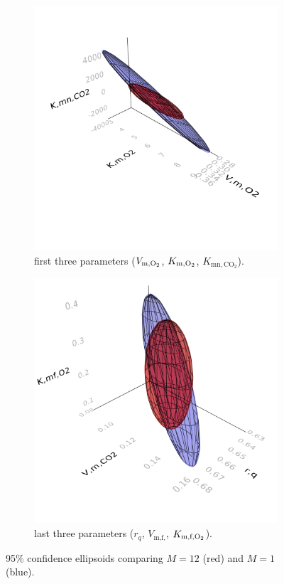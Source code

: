 \begin{figure}[H]
	\begin{subfigure}[b]{0.45\textwidth}
		\includegraphics[width=1.0\textwidth]{figure/paper 2/ellipsoid1_3.png}
		\caption{first three parameters ($V_{\text{m},\text{O}_2}$, $K_{\text{m},\text{O}_2}$, $K_{\text{mn},\text{CO}_2}$).}
		\label{figlocalf}
	\end{subfigure}
	\begin{subfigure}[b]{0.45\textwidth}
		\includegraphics[width=1.0\textwidth]{figure/paper 2/ellipsoid4_6.png}
		\caption{last three parameters ($r_q$, $V_{\text{m,f,}}$, $K_{\text{m,f},\text{O}_2}$).}
		\label{figlocalg}
	\end{subfigure}
	\caption{95\% confidence ellipsoids comparing $M=12$ (red) and $M=1$ (blue).} 
	\label{figellipsoid}	
\end{figure}
